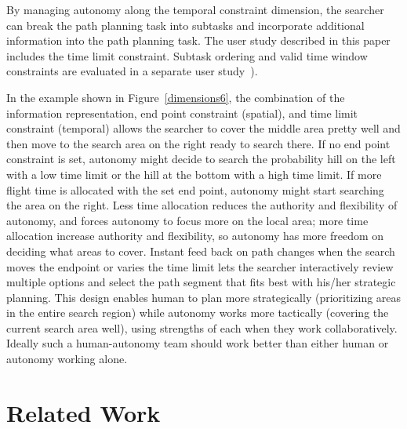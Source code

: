 By managing autonomy along the temporal constraint dimension, the searcher can break the path planning task into subtasks and incorporate additional information into the path planning task. The user study described in this paper includes the time limit constraint. Subtask ordering and valid time window constraints are evaluated in a separate user study~\cite{Clark2013Hierarchical}).

In the example shown in Figure~\ref{dimensions6}, the combination of the information representation, end point constraint (spatial), and time limit constraint (temporal) allows the searcher to cover the middle area pretty well and then move to the search area on the right ready to search there. If no end point constraint is set, autonomy might decide to search the probability hill on the left with a low time limit or the hill at the bottom with a high time limit. If more flight time is allocated with the set end point, autonomy might start searching the area on the right. Less time allocation reduces the authority and flexibility of autonomy, and forces autonomy to focus more on the local area; more time allocation increase authority and flexibility, so autonomy has more freedom on deciding what areas to cover. Instant feed back on path changes when the search moves the endpoint or varies the time limit lets the searcher interactively review multiple options and select the path segment that fits best with his/her strategic planning. This design enables human to plan more strategically (prioritizing areas in the entire search region) while autonomy works more tactically (covering the current search area well), using strengths of each when they work collaboratively. Ideally such a human-autonomy team should work better than either human or autonomy working alone.

\section{Related Work}
\label{sec:RelatedWork6}

